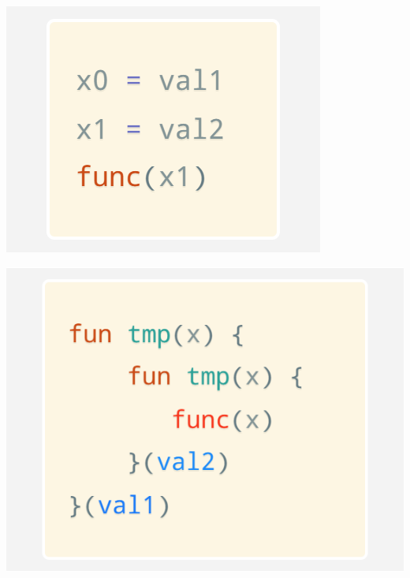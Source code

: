 \documentclass[a1,portrait]{a1poster}
\begin{document}
\begin{multicols}{2}
\begin{multicols}{3}
\begin{minipage}[b]{1\linewidth}
\begin{center}\vspace{0.1cm}
\includegraphics[width=0.9\linewidth]{figs/let-by-mangling.png}
\end{center}\vspace{0.1cm}
\end{minipage}


\begin{minipage}[b]{1\linewidth}
\begin{center}\vspace{0.1cm}
\includegraphics[width=0.9\linewidth]{figs/let-by-im-call.png}
\end{center}\vspace{0.1cm}
\end{minipage}


\end{multicols}
\end{multicols}
\end{document}
